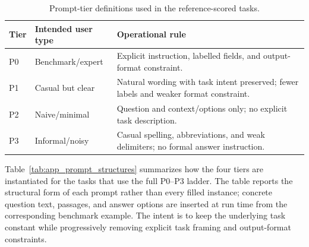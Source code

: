 \documentclass[letterpaper]{article}
\begin{document}
\begin{table}[t]
  \small\centering
  \caption{Prompt-tier definitions used in the reference-scored tasks.}
  \label{tab:app_prompt_tiers}
  \begin{tabular}{@{}lp{2.6cm}p{9.2cm}@{}}
    \toprule
    Tier & Intended user type & Operational rule \\
    \midrule
    P0 & Benchmark/expert & Explicit instruction, labelled fields, and output-format constraint. \\
    P1 & Casual but clear & Natural wording with task intent preserved; fewer labels and weaker format constraint. \\
    P2 & Naive/minimal & Question and context/options only; no explicit task description. \\
    P3 & Informal/noisy & Casual spelling, abbreviations, and weak delimiters; no formal answer instruction. \\
    \bottomrule
  \end{tabular}
\end{table}

Table~\ref{tab:app_prompt_structures} summarizes how the four tiers are
instantiated for the tasks that use the full P0--P3 ladder. The table reports
the structural form of each prompt rather than every filled instance; concrete
question text, passages, and answer options are inserted at run time from the
corresponding benchmark example. The intent is to keep the underlying task
constant while progressively removing explicit task framing and output-format
constraints.
\end{document}

